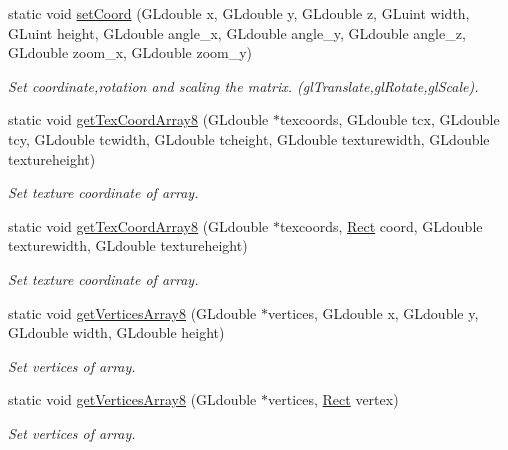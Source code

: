 \begin{DoxyCompactItemize}
static void \hyperlink{class_f2_c_1_1_render_manager_a7ce51f53fa958590be6f11ec812c16a2}{setCoord} (GLdouble x, GLdouble y, GLdouble z, GLuint width, GLuint height, GLdouble angle\_\-x, GLdouble angle\_\-y, GLdouble angle\_\-z, GLdouble zoom\_\-x, GLdouble zoom\_\-y)
\begin{DoxyCompactList}\small\item\em Set coordinate,rotation and scaling the matrix. (glTranslate,glRotate,glScale). \item\end{DoxyCompactList}\item 
static void \hyperlink{class_f2_c_1_1_render_manager_a607fca637e3541cb7b6ce06186c1bd14}{getTexCoordArray8} (GLdouble $\ast$texcoords, GLdouble tcx, GLdouble tcy, GLdouble tcwidth, GLdouble tcheight, GLdouble texturewidth, GLdouble textureheight)
\begin{DoxyCompactList}\small\item\em Set texture coordinate of array. \item\end{DoxyCompactList}\item 
static void \hyperlink{class_f2_c_1_1_render_manager_a0c21150eafaeb5d9f9c09263a217422f}{getTexCoordArray8} (GLdouble $\ast$texcoords, \hyperlink{class_f2_c_1_1_rect}{Rect} coord, GLdouble texturewidth, GLdouble textureheight)
\begin{DoxyCompactList}\small\item\em Set texture coordinate of array. \item\end{DoxyCompactList}\item 
static void \hyperlink{class_f2_c_1_1_render_manager_a0b1798096cef10e39a84ae51cff1941d}{getVerticesArray8} (GLdouble $\ast$vertices, GLdouble x, GLdouble y, GLdouble width, GLdouble height)
\begin{DoxyCompactList}\small\item\em Set vertices of array. \item\end{DoxyCompactList}\item 
static void \hyperlink{class_f2_c_1_1_render_manager_a95065314a2d5255c72d26c00f08baa19}{getVerticesArray8} (GLdouble $\ast$vertices, \hyperlink{class_f2_c_1_1_rect}{Rect} vertex)
\begin{DoxyCompactList}\small\item\em Set vertices of array. \item\end{DoxyCompactList}\item 

\end{DoxyCompactItemize}
